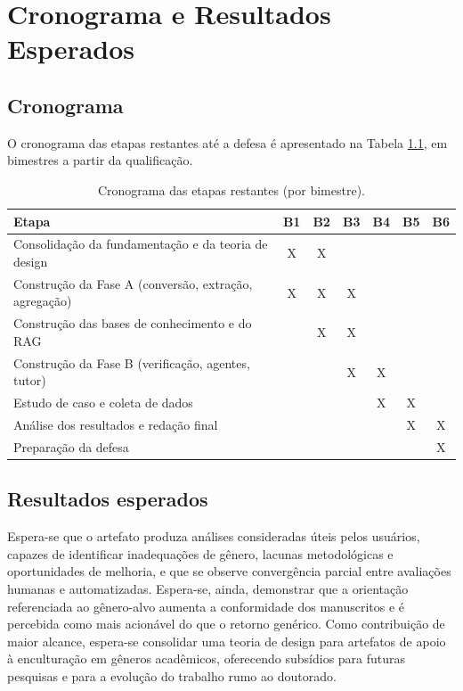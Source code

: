 \chapter{Cronograma e Resultados Esperados}\label{chap:Cronograma e Resultados Esperados}

\section{Cronograma}\label{sec:Cronograma}

O cronograma das etapas restantes até a defesa é apresentado na Tabela \ref{tab:cronograma}, em bimestres a partir da qualificação.

\begin{table}[htbp]
\centering
\caption{Cronograma das etapas restantes (por bimestre).}
\label{tab:cronograma}
\small
\begin{tabular}{p{7.5cm}cccccc}
\toprule
Etapa & B1 & B2 & B3 & B4 & B5 & B6 \\
\midrule
Consolidação da fundamentação e da teoria de design & X & X & & & & \\
Construção da Fase A (conversão, extração, agregação) & X & X & X & & & \\
Construção das bases de conhecimento e do RAG & & X & X & & & \\
Construção da Fase B (verificação, agentes, tutor) & & & X & X & & \\
Estudo de caso e coleta de dados & & & & X & X & \\
Análise dos resultados e redação final & & & & & X & X \\
Preparação da defesa & & & & & & X \\
\bottomrule
\end{tabular}
\end{table}

\section{Resultados esperados}\label{sec:Resultados esperados}

Espera-se que o artefato produza análises consideradas úteis pelos usuários, capazes de identificar inadequações de gênero, lacunas metodológicas e oportunidades de melhoria, e que se observe convergência parcial entre avaliações humanas e automatizadas. Espera-se, ainda, demonstrar que a orientação referenciada ao gênero-alvo aumenta a conformidade dos manuscritos e é percebida como mais acionável do que o retorno genérico. Como contribuição de maior alcance, espera-se consolidar uma teoria de design para artefatos de apoio à enculturação em gêneros acadêmicos, oferecendo subsídios para futuras pesquisas e para a evolução do trabalho rumo ao doutorado.